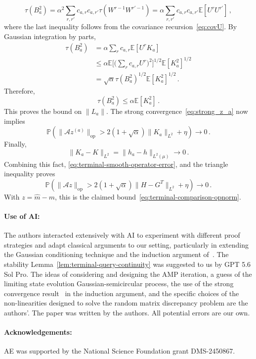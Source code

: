 \documentclass[11pt]{article}
\theoremstyle{definition}
\theoremstyle{remark}
\numberwithin{equation}{section}
\numberwithin{theorem}{section}
\newcommand{\E}{\mathbb E}
\newcommand{\Prob}{\mathbb P}
\newcommand{\op}{\mathrm{op}}
\newcommand{\cA}{\mathcal A}
\begin{document}
\[
	\tau(B_a^2) = \alpha^2 \sum_{r,r'} c_{a,r}c_{a,r'} \tau(W^{r-1}W^{r'-1})
	= \alpha \sum_{r,r'} c_{a,r}c_{a,r'} \E[U^{r}U^{r'}]\,,
\]
where the last inequality follows from the covariance recursion~\eqref{eq:covU}.
By Gaussian integration by parts, 
\begin{align*}
	\tau(B_a^2) &= \alpha \sum_{r} c_{a,r} \E[U^{r}K_a] \\
	&\le \alpha \E\Big[\big(\sum_{r} c_{a,r} U^{r}\big)^2\Big]^{1/2} \E[K_a^2]^{1/2} \\
    &= \sqrt{\alpha}\tau(B_a^2)^{1/2}\E[K_a^2]^{1/2}\,.
\end{align*}
Therefore, 
\[\tau(B_a^2) \le \alpha\E[K_a^2]\,.\]
This proves the bound on $\|L_a\|$.
The strong convergence~\eqref{eq:strong_z_a} now implies
\[
 \Prob\left(
 \|\cA z^{(a)}\|_{\op}
 >
 2(1+\sqrt\alpha)\|K_a\|_{L^2}+\eta
 \right)\longrightarrow 0\,.
\]
Finally,
\[
 \|K_a-K\|_{L^2}
 =\|h_a-h\|_{L^2(\mu)}
 \longrightarrow 0 \,.
\]
Combining this fact, \eqref{eq:terminal-smooth-operator-error}, and the
triangle inequality proves 
\[
 \Prob\left(
 \|\cA z\|_{\op}
 >
 2(1+\sqrt\alpha)\|H - G^T\|_{L^2}+\eta
 \right)\longrightarrow 0\,.
\]
With $z =\widehat m - m$, this is the claimed bound~\eqref{eq:terminal-comparison-opnorm}.

\paragraph{Use of AI:} The authors interacted extensively with AI to experiment with different proof strategies and adapt classical arguments to our setting, particularly in extending the Gaussian conditioning technique and the induction argument of~\cite{berthier2017state}. The stability Lemma~\ref{lem:terminal-query-continuity} was suggested to us by GPT 5.6 Sol Pro. 
The ideas of considering and designing the AMP iteration, a guess of the limiting state evolution Gaussian-semicircular process, the use of the strong convergence result~\cite{fan2021principal} in the induction argument, and the specific choices of the non-linearities designed to solve the random matrix discrepancy problem are the authors'. The paper was written by the authors. All potential errors are our own. 

\paragraph{Acknowledgements:} AE was supported by the National Science Foundation grant DMS-2450867.
\end{document}
